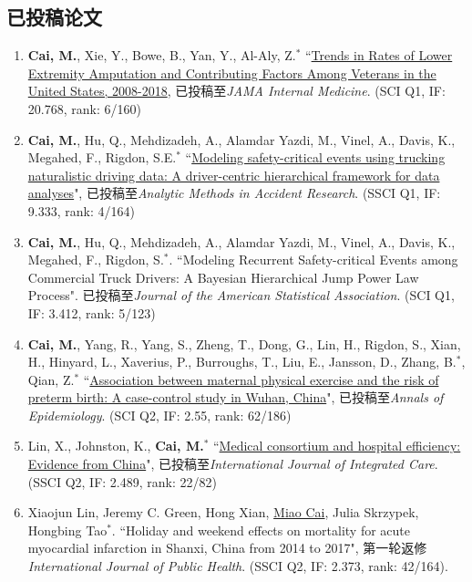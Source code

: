 \documentclass[11pt, a4paper]{article}
\begin{document}
	\subsection*{已投稿论文}
	\begin{enumerate}[leftmargin=0ex,itemsep=1ex]
		\item \textbf{Cai, M.}, Xie, Y., Bowe, B., Yan, Y., Al-Aly, Z.$^\ast$ ``\ul{Trends in Rates of Lower Extremity Amputation and Contributing Factors Among Veterans in the United States, 2008-2018}, 已投稿至\emph{JAMA Internal Medicine}. (SCI Q1, IF: 20.768, rank: 6/160)
		
		\item \textbf{Cai, M.}, Hu, Q., Mehdizadeh, A., Alamdar Yazdi, M., Vinel, A., Davis, K., Megahed, F., Rigdon, S.E.$^\ast$ ``\ul{Modeling safety-critical events using trucking naturalistic driving data: A driver-centric hierarchical framework for data analyses}", 已投稿至\emph{Analytic Methods in Accident Research}. (SSCI Q1, IF: 9.333, rank: 4/164)
		
		\item \textbf{Cai, M.}, Hu, Q., Mehdizadeh, A., Alamdar Yazdi, M., Vinel, A., Davis, K., Megahed, F., Rigdon, S.$^\ast$. ``Modeling Recurrent Safety-critical Events among Commercial Truck Drivers: A Bayesian Hierarchical Jump Power Law Process". 已投稿至\emph{Journal of the American Statistical Association}. (SCI Q1, IF: 3.412, rank: 5/123)
		
		\item \textbf{Cai, M.}, Yang, R., Yang, S., Zheng, T., Dong, G., Lin, H., Rigdon, S., Xian, H., Hinyard, L., Xaverius, P., Burroughs, T., Liu, E., Jansson, D., Zhang, B.$^\ast$, Qian, Z.$^\ast$ ``\ul{Association between maternal physical exercise and the risk of preterm birth: A case-control study in Wuhan, China}", 已投稿至\emph{Annals of Epidemiology}. (SCI Q2, IF: 2.55, rank: 62/186)
		
		\item Lin, X., Johnston, K., \textbf{Cai, M.}$^*$ ``\ul{Medical consortium and hospital efficiency: Evidence from China}", 已投稿至\emph{International Journal of Integrated Care}. (SSCI Q2, IF: 2.489, rank: 22/82)
		
		\item Xiaojun Lin, Jeremy C. Green, Hong Xian, \underline{Miao Cai}, Julia Skrzypek, Hongbing Tao$^\ast$. ``Holiday and weekend effects on mortality for acute myocardial infarction in Shanxi, China from 2014 to 2017", 第一轮返修\emph{International Journal of Public Health}. (SSCI Q2, IF: 2.373, rank: 42/164).
	\end{enumerate}
	
\end{document}
